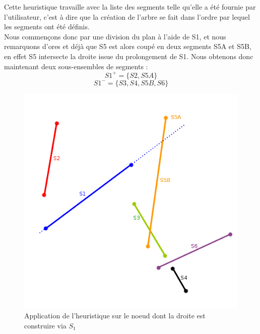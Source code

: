 \documentclass[11pt,a4paper]{article}
\theoremstyle{definition}
\theoremstyle{remark}
\begin{document}
Cette heuristique travaille avec la liste des segments telle qu'elle a été fournie par l'utilisateur, c'est à dire que la création de l'arbre se fait dans l'ordre par lequel les segments ont été définis. \\

Nous commençons donc par une division du plan à l'aide de S1, et nous remarquons d'ores et déjà que S5 est alors coupé en deux segments S5A et S5B, en effet S5 intersecte la droite issue du prolongement de S1. Nous obtenons donc maintenant deux sous-ensembles de segments : 
$$S1^+ = \{S2, S5A\}$$
$$S1^- = \{S3,S4,S5B,S6\}$$

\begin{figure}[H]
\centering
\includegraphics[scale=0.6]{bsp_ex_2.png}
\caption{Application de l'heuristique sur le noeud dont la droite est construire via $S_1$}
\label{bsp_inordre}
\end{figure}
\end{document}
